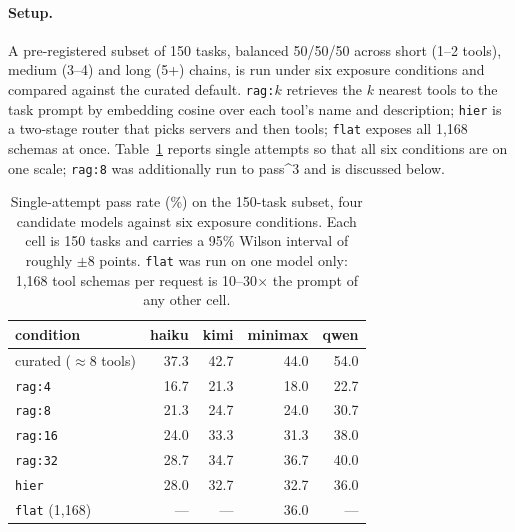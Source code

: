 \paragraph{Setup.} A pre-registered subset of 150 tasks, balanced 50/50/50
across short (1--2 tools), medium (3--4) and long (5+) chains, is run under six
exposure conditions and compared against the curated default. \texttt{rag:$k$}
retrieves the $k$ nearest tools to the task prompt by embedding cosine over
each tool's name and description; \texttt{hier} is a two-stage router that picks
servers and then tools; \texttt{flat} exposes all 1{,}168 schemas at once.
Table~\ref{tab:openuniverse} reports single attempts so that all six conditions
are on one scale; \texttt{rag:8} was additionally run to pass\textasciicircum{}3
and is discussed below.

\begin{table}[h]
  \centering \small
  \begin{tabular}{lrrrr}
    \toprule
    condition & haiku & kimi & minimax & qwen \\
    \midrule
    curated (\(\approx\)8 tools) & 37.3 & 42.7 & 44.0 & 54.0 \\
    \midrule
    \texttt{rag:4}   & 16.7 & 21.3 & 18.0 & 22.7 \\
    \texttt{rag:8}   & 21.3 & 24.7 & 24.0 & 30.7 \\
    \texttt{rag:16}  & 24.0 & 33.3 & 31.3 & 38.0 \\
    \texttt{rag:32}  & 28.7 & 34.7 & 36.7 & 40.0 \\
    \texttt{hier}    & 28.0 & 32.7 & 32.7 & 36.0 \\
    \texttt{flat} (1{,}168) & --- & --- & 36.0 & --- \\
    \bottomrule
  \end{tabular}
  \caption{Single-attempt pass rate (\%) on the 150-task subset, four candidate
    models against six exposure conditions. Each cell is 150 tasks and carries
    a 95\% Wilson interval of roughly \(\pm\)8 points. \texttt{flat} was run on
    one model only: 1{,}168 tool schemas per request is 10--30\(\times\) the
    prompt of any other cell.}
  \label{tab:openuniverse}
\end{table}

